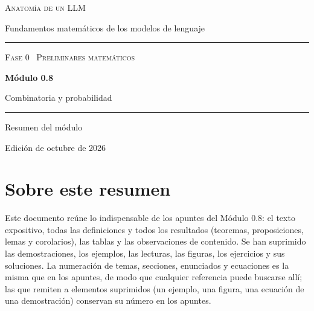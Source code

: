\documentclass[11pt,a4paper,twoside,openany]{book}
\begin{document}
\frontmatter
\begin{titlepage}
\centering
\vspace*{2.5cm}
{\large\scshape Anatomía de un LLM}\par
\vspace{0.4cm}
{\normalsize Fundamentos matemáticos de los modelos de lenguaje}\par
\vspace{2.2cm}
\rule{\textwidth}{0.8pt}\par\vspace{0.5cm}
{\small\scshape Fase 0 \textperiodcentered\ Preliminares matemáticos}\par\vspace{0.3cm}
{\Huge\bfseries Módulo 0.8\par}\vspace{0.3cm}
{\LARGE Combinatoria y probabilidad\par}
\vspace{0.5cm}\rule{\textwidth}{0.4pt}\par
\vspace{1.6cm}
{\large Resumen del módulo}\par
\vfill
{\small Edición de octubre de 2026}\par
\end{titlepage}

\chapter*{Sobre este resumen}

Este documento reúne lo indispensable de los apuntes del Módulo 0.8: el texto expositivo, todas las definiciones y todos los resultados (teoremas, proposiciones, lemas y corolarios), las tablas y las observaciones de contenido. Se han suprimido las demostraciones, los ejemplos, las lecturas, las figuras, los ejercicios y sus soluciones. La numeración de temas, secciones, enunciados y ecuaciones es la misma que en los apuntes, de modo que cualquier referencia puede buscarse allí; las que remiten a elementos suprimidos (un ejemplo, una figura, una ecuación de una demostración) conservan su número en los apuntes.
\end{document}
